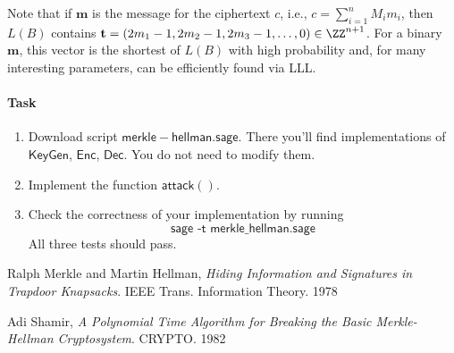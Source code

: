 \documentclass[11pt]{exam}
\theoremstyle{definition}
\let\vec\mathbf
\begin{document}
Note that if $\vec m$ is the message for the ciphertext $c$, i.e., $c =\sum_{i=1}^n M_i m_i $, then $L(B)$ contains $\vec t = (2m_1 -1, 2m_2-1, 2m_3 - 1, \ldots, 0) \in \ZZ^{n+1}$. For a binary $\vec m$, this vector is the shortest of $L(B)$ with high probability and, for many interesting parameters, can be efficiently found via LLL.

\medskip 
\paragraph{Task}

\begin{enumerate}
	\item Download script $\mathsf{merkle-hellman.sage}$. There you'll find implementations of $\mathsf{KeyGen}$,   $\mathsf{Enc}$, $ \mathsf{Dec}$. You do not need to modify them.
	\item Implement the function $\mathsf{attack()}$.
	\item Check the correctness of your implementation by running
	\[
		\textsf{sage -t merkle\_hellman.sage}
	\]
	All three tests should pass.
\end{enumerate}


\begin{thebibliography}{9}
	 Ralph Merkle and Martin Hellman,
	\textit{Hiding Information and Signatures in Trapdoor Knapsacks}. IEEE Trans. Information Theory. 1978
	
	 Adi Shamir, 
	\textit{A Polynomial Time Algorithm for Breaking the Basic Merkle-Hellman Cryptosystem}. CRYPTO. 1982
	
\end{thebibliography}
\end{document}
